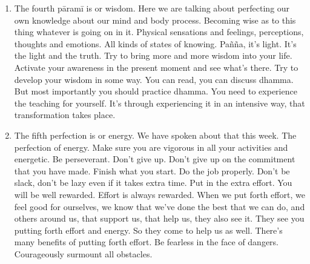 \documentclass[letterpaper,10pt,english]{sphinxmanual}
\begin{document}
\begin{enumerate}
\item {} 
\sphinxAtStartPar
The fourth pāramī is
or wisdom. Here we are talking about
perfecting our own knowledge about our mind and body process. Becoming wise as to this thing whatever is going on in it. Physical sensations  and  feelings,  perceptions,  thoughts  and  emotions. All  kinds  of
states of knowing. Pañña, it’s light. It’s the light and the truth. Try to
bring more and more wisdom into your life. Activate your awareness
in the present moment and see what’s there. Try to develop your wisdom in some way. You can read, you can discuss dhamma. But most
importantly you should practice dhamma. You need to experience the
teaching for yourself. It’s through experiencing it in an intensive way,
that transformation takes place.

\item {} 
\sphinxAtStartPar
The fifth perfection is
or energy. We have spoken about that 
this week. The perfection of energy. Make sure you are vigorous in all
your activities and energetic. Be perseverant. Don’t give up. Don’t give
up on the commitment that you have made. Finish what you start. Do
the job properly. Don’t be slack, don’t be lazy even if it takes extra time.
Put in the extra effort. You will be well rewarded. Effort is always rewarded. When we put forth effort, we feel good for ourselves, we know
that we’ve done the best that we can do, and others around us, that support us, that help us, they also see it. They see you putting forth effort
and energy. So they come to help us as well. There’s many benefits of
putting forth effort. Be fearless in the face of dangers. Courageously
surmount all obstacles.


\end{enumerate}
\end{document}
